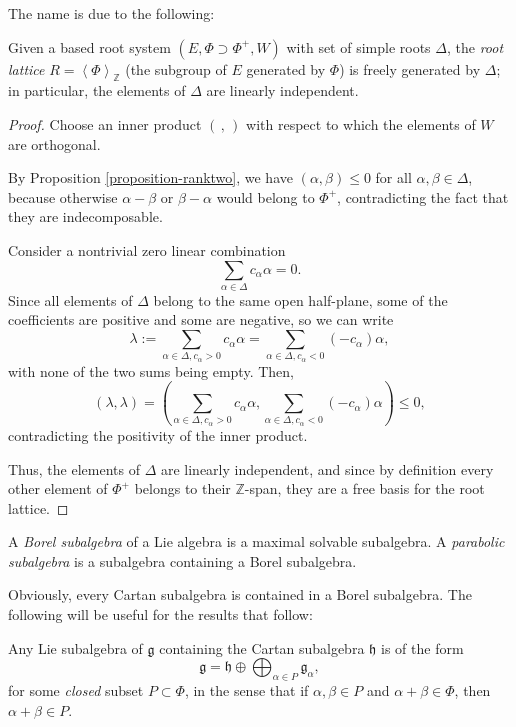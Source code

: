 The name is due to the following:

\begin{proposition}
\label{proposition-basis-rootsystem}
Given a based root system $(E,\Phi \supset \Phi^+, W)$ with set of simple roots $\Delta$,
the \emph{root lattice} $R=\left< \Phi \right>_{\mathbb Z}$ (the subgroup of $E$ generated by $\Phi$) is freely generated by $\Delta$; in particular, the elements of $\Delta$ are linearly independent.
\end{proposition}

\begin{proof}
Choose an inner product $(\, , \, )$ with respect to which the elements of $W$ are orthogonal. 

By Proposition \ref{proposition-ranktwo}, we have $(\alpha,\beta)\le 0$ for all $\alpha,\beta\in\Delta$, because otherwise $\alpha-\beta$ or $\beta-\alpha$ would belong to $\Phi^+$, contradicting the fact that they are indecomposable.

Consider a nontrivial zero linear combination
$$ \sum_{\alpha\in \Delta} c_\alpha \alpha = 0.$$
 Since all elements of $\Delta$ belong to the same open half-plane, some of the coefficients are positive and some are negative, so we can write
 $$ \lambda:= \sum_{\alpha\in \Delta, c_\alpha>0} c_\alpha \alpha = \sum_{\alpha\in \Delta, c_\alpha< 0} (-c_\alpha)\alpha,$$
 with none of the two sums being empty. Then, 
 $$(\lambda,\lambda) = \left(\sum_{\alpha\in \Delta, c_\alpha>0} c_\alpha \alpha, \sum_{\alpha\in \Delta, c_\alpha< 0} (-c_\alpha)\alpha\right) \le 0,$$
contradicting the positivity of the inner product. 

Thus, the elements of $\Delta$ are linearly independent, and since by definition every other element of $\Phi^+$ belongs to their $\mathbb Z$-span, they are a free basis for the root lattice.
\end{proof}





\begin{definition}
\label{definition-Borel-parabolic}
 A {\it Borel subalgebra} of a Lie algebra is a maximal solvable subalgebra. A {\it parabolic subalgebra} is a subalgebra containing a Borel subalgebra.
\end{definition}

Obviously, every Cartan subalgebra is contained in a Borel subalgebra. The following will be useful for the results that follow:

\begin{lemma}
\label{lemma-closed-subset}
Any Lie subalgebra of $\mathfrak g$ containing the Cartan subalgebra $\mathfrak h$ is of the form  
$$ \mathfrak g = \mathfrak h \oplus \bigoplus_{\alpha\in P} \mathfrak g_\alpha,$$
for some \emph{closed} subset $P\subset \Phi$, in the sense that if $\alpha,\beta\in P$ and $\alpha+\beta\in \Phi$, then $\alpha+\beta\in P$.
\end{lemma}

